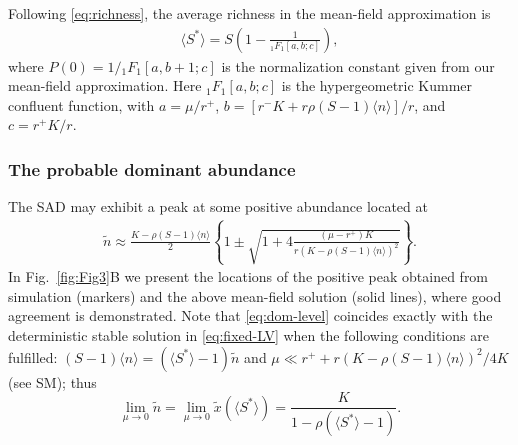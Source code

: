 \documentclass[9pt,twocolumn,twoside,lineno]{pnas-new}
\begin{document}
Following \eqref{eq:richness}, the average richness in the mean-field approximation is
\begin{eqnarray}
\langle S^*\rangle = S \left( 1 - \frac{1}{{_1}F_1[a,b;c]}\right ) , 
\label{eq:mf-richness}
\end{eqnarray}
where $P(0)=1/{_1F_1}[a,b+1;c]$ is the normalization constant given from our mean-field approximation.
Here ${_1F_1}[a,b;c] $ is the hypergeometric Kummer confluent function, with $a=\mu/r^+$, ${b}= %
[r^-K+r\rho (S-1)\langle n\rangle  ]/r$, and ${c}=%
{r^+ K}/{r}$.

\subsubsection{The probable dominant abundance}

The SAD may exhibit a peak at some positive abundance %
located at
\begin{eqnarray}
    \label{eq:dom-level}
    \tilde{n}\approx
    \frac{K-\rho(S-1)\langle n\rangle}{2}\left\{1 \pm \sqrt{1+4\frac{(\mu-r^+) K}{r(K-\rho(S-1)\langle n\rangle)^2}}\right\}.
\end{eqnarray}
In Fig.~\ref{fig:Fig3}B we present the locations of the positive peak obtained from simulation (markers) and the above mean-field solution (solid lines), where good agreement is demonstrated.
Note that \eqref{eq:dom-level} coincides exactly with the deterministic stable solution in \eqref{eq:fixed-LV} when the following conditions are fulfilled: $(S-1)\langle n\rangle = (\langle S^* \rangle - 1 ) \tilde{n} $ and $\mu \ll r^++ r(K-\rho(S-1)\langle n\rangle)^2 / 4K $ (see SM); thus
\begin{equation}
\lim_{\mu\rightarrow 0}\tilde{n}=\lim_{\mu\rightarrow 0}\tilde{x}\left(\langle S^* \rangle \right) = \frac{K}{1-\rho(\langle S^*\rangle -1)}.
\label{eq:Lim_ss}
\end{equation}
\end{document}
